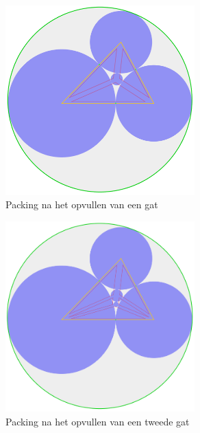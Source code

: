 \documentclass[12pt,a4paper,oneside]{book}
\begin{document}
\begin{figure}
  \centering
  \includegraphics[width=0.65\textwidth]{voorbeeld-gat-stap-2.png}
  \caption{Packing na het opvullen van een gat} \label{fig:voorbeeld-gat-stap-2} 
\end{figure}

\begin{figure}
  \centering
  \includegraphics[width=0.65\textwidth]{voorbeeld-gat-stap-3.png}
  \caption{Packing na het opvullen van een tweede gat} \label{fig:voorbeeld-gat-stap-3} 
\end{figure}
\end{document}
